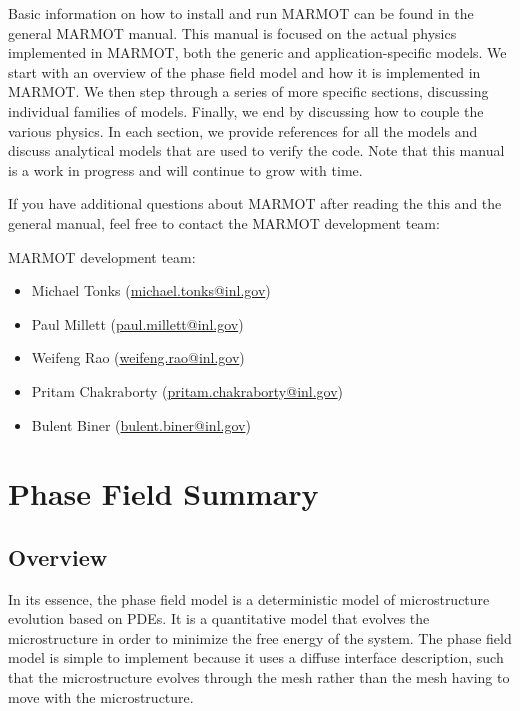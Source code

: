\documentclass[letter,12pt,fleqn]{article}
\begin{document}
Basic information on how to install and run MARMOT can be found in the general MARMOT manual. This manual is focused on the actual physics implemented in MARMOT, both the generic and application-specific models. We start with an overview of the phase field model and how it is implemented in MARMOT. We then step through a series of more specific sections, discussing individual families of models. Finally, we end by discussing how to couple the various physics. In each section, we provide references for all the models and discuss analytical models that are used to verify the code. Note that this manual is a work in progress and will continue to grow with time.

If you have additional questions about MARMOT after reading the this and the general manual, feel free to contact the MARMOT development team:

\vspace{20pt}

\noindent MARMOT development team:

\begin{itemize}
\item Michael Tonks (\href{mailto:michael.tonks@inl.gov}{michael.tonks@inl.gov})
\item Paul Millett (\href{mailto:paul.millett@inl.gov}{paul.millett@inl.gov})
\item Weifeng Rao (\href{mailto:weifeng.rao@inl.gov}{weifeng.rao@inl.gov})
\item Pritam  Chakraborty (\href{mailto:pritam.chakraborty@inl.gov}{pritam.chakraborty@inl.gov})
\item Bulent Biner (\href{mailto:bulent.biner@inl.gov}{bulent.biner@inl.gov})
\end{itemize}





\section{Phase Field Summary}

\subsection{Overview}

In its essence, the phase field model is a deterministic model of microstructure evolution based on PDEs. It is a quantitative model that evolves the microstructure in order to minimize the free energy of the system. The phase field model is simple to implement because it uses a diffuse interface description, such that the microstructure evolves through the mesh rather than the mesh having to move with the microstructure. 
\end{document}
